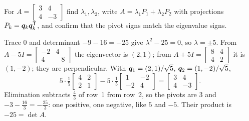 \begin{exercise}\label{exr:u29-345}
For $A=\left[\begin{smallmatrix}3&4\\4&-3\end{smallmatrix}\right]$ find $\lambda_1,\lambda_2$, write
$A=\lambda_1P_1+\lambda_2P_2$ with projections $P_k=\boldsymbol{q}_k\boldsymbol{q}_k^{\mathsf{T}}$, and confirm that the pivot signs
match the eigenvalue signs.
\end{exercise}
\begin{solution}
Trace $0$ and determinant $-9-16=-25$ give $\lambda^2-25=0$, so $\lambda=\pm5$. From
$A-5I=\left[\begin{smallmatrix}-2&4\\4&-8\end{smallmatrix}\right]$ the eigenvector is $(2,1)$; from
$A+5I=\left[\begin{smallmatrix}8&4\\4&2\end{smallmatrix}\right]$ it is $(1,-2)$; they are perpendicular.
With $\boldsymbol{q}_1=(2,1)/\sqrt5$, $\boldsymbol{q}_2=(1,-2)/\sqrt5$,
\[
  5\cdot\tfrac15\begin{bmatrix}4&2\\2&1\end{bmatrix}-5\cdot\tfrac15\begin{bmatrix}1&-2\\-2&4\end{bmatrix}
  =\begin{bmatrix}3&4\\4&-3\end{bmatrix}.
\]
Elimination subtracts $\tfrac43$ of row~1 from row~2, so the pivots are $3$ and
$-3-\tfrac{16}{3}=-\tfrac{25}{3}$: one positive, one negative, like $5$ and $-5$. Their product is
$-25=\det A$.
\end{solution}
